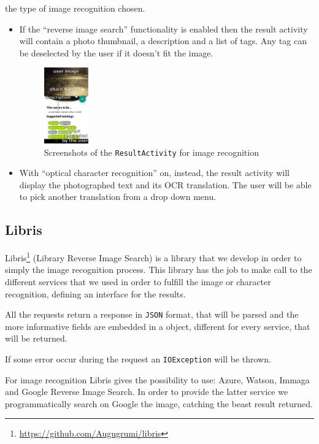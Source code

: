 \begin{itemize}
        the type of image recognition chosen.
    \begin{itemize}
     \item If the ``reverse image search'' functionality is enabled then the
           result activity will contain a photo thumbnail, a description and a list of
           tags. Any tag can be deselected by the user if it doesn't fit the image.
    \begin{figure}[h]
        \centering
        \includegraphics[width=0.18\textwidth]{../img/image_result_activity}
        \caption{Screenshots of the \texttt{ResultActivity} for image recognition}
        \label{fig:imageResultActivity}
    \end{figure}
     \item With ``optical character recognition'' on, instead, the result
           activity will display the photographed text and its OCR translation. The user
           will be able to pick another translation from a drop down menu.
    \end{itemize}
\end{itemize}

\subsection{Libris}
Libris\footnote{\url{https://github.com/Augugrumi/libris}} (Library Reverse Image Search) is a library that we develop in order to 
simply the image recognition process. This library has the job to make call to 
the different services that we used in order to fulfill the image or character 
recognition, defining an interface for the results.

All the requests return a response in \texttt{JSON} format, that will be parsed and the 
more informative fields are embedded in a object, different for every service, 
that will be returned. 

If some error occur during the request an \texttt{IOException} will be thrown.

For image recognition Libris gives the possibility to use: Azure, Watson, Immaga 
and Google Reverse Image Search. In order to provide the latter service we 
programmatically search on Google the image, catching the beast result returned.

